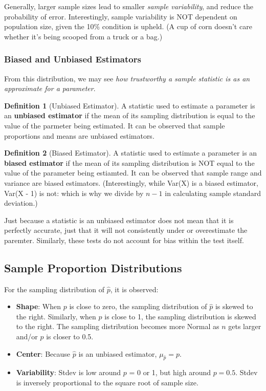\documentclass[12pt, a4paper]{article}
\theoremstyle{definition}
\newtheorem{definition}{Definition}
\begin{document}
Generally, larger sample sizes lead to smaller \textit{sample variability}, and reduce the probability of error.
Interestingly, sample variability is NOT dependent on population size, given the 10\% condition is upheld.
(A cup of corn doesn't care whether it's being scooped from a truck or a bag.)



\subsubsection{Biased and Unbiased Estimators}
From this distribution, we may see \textit{how trustworthy a sample statistic is as an approximate for a parameter}.

\begin{definition}[Unbiased Estimator]
    A statistic used to estimate a parameter is an \textbf{unbiased estimator} if the mean of its sampling distribution is equal to the value of the parmeter being estimated.
    It can be observed that sample proportions and means are unbiased estimators.
\end{definition}

\begin{definition}[Biased Estimator]
    A statistic used to estimate a parameter is an \textbf{biased estimator} if the mean of its sampling distribution is NOT equal to the value of the parameter being estiamted.
    It can be observed that sample range and variance are biased estimators.
    (Interestingly, while Var(X) is a biased estimator, Var(X - 1) is not: which is why we divide by $n-1$ in calculating sample standard deviation.)
\end{definition}

Just because a statistic is an unbiased estimator does not mean that it is perfectly accurate, just that it will not consistently under or overestimate the paremter.
Similarly, these tests do not account for bias within the test itself.

\subsection{Sample Proportion Distributions}

For the sampling distribution of $\hat{p}$, it is observed:
\begin{itemize}
    \item \textbf{Shape}: When $p$ is close to zero, the sampling distribution of $\hat{p}$ is skewed to the right. Similarly, when $p$ is close to 1, the sampling distribution is skewed to the right.
    The sampling distribution becomes more Normal as $n$ gets larger and/or $p$ is closer to 0.5.
    \item \textbf{Center}: Because $\hat{p}$ is an unbiased estimator, $\mu_{\hat{p}} = p$.
    \item \textbf{Variability}: Stdev is low around $p$ = 0 or 1, but high around $p = 0.5$. Stdev is inversely proportional to the square root of sample size.
\end{itemize}
\end{document}
